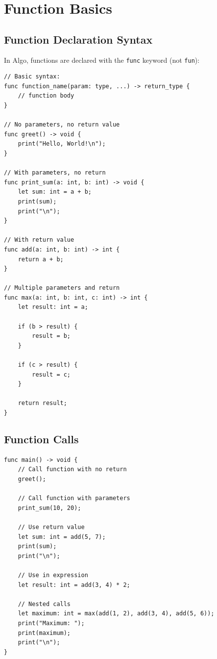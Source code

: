\documentclass[12pt,a4paper,oneside]{book}
\newcommand{\code}[1]{\texttt{#1}}
\begin{document}
\section{Function Basics}

\subsection{Function Declaration Syntax}

In Algo, functions are declared with the \code{func} keyword (not \code{fun}):

\begin{lstlisting}[style=algo, caption={Function Declaration Syntax}]
// Basic syntax:
func function_name(param: type, ...) -> return_type {
    // function body
}

// No parameters, no return value
func greet() -> void {
    print("Hello, World!\n");
}

// With parameters, no return
func print_sum(a: int, b: int) -> void {
    let sum: int = a + b;
    print(sum);
    print("\n");
}

// With return value
func add(a: int, b: int) -> int {
    return a + b;
}

// Multiple parameters and return
func max(a: int, b: int, c: int) -> int {
    let result: int = a;
    
    if (b > result) {
        result = b;
    }
    
    if (c > result) {
        result = c;
    }
    
    return result;
}
\end{lstlisting}

\subsection{Function Calls}

\begin{lstlisting}[style=algo, caption={Calling Functions}]
func main() -> void {
    // Call function with no return
    greet();
    
    // Call function with parameters
    print_sum(10, 20);
    
    // Use return value
    let sum: int = add(5, 7);
    print(sum);
    print("\n");
    
    // Use in expression
    let result: int = add(3, 4) * 2;
    
    // Nested calls
    let maximum: int = max(add(1, 2), add(3, 4), add(5, 6));
    print("Maximum: ");
    print(maximum);
    print("\n");
}
\end{lstlisting}
\end{document}
